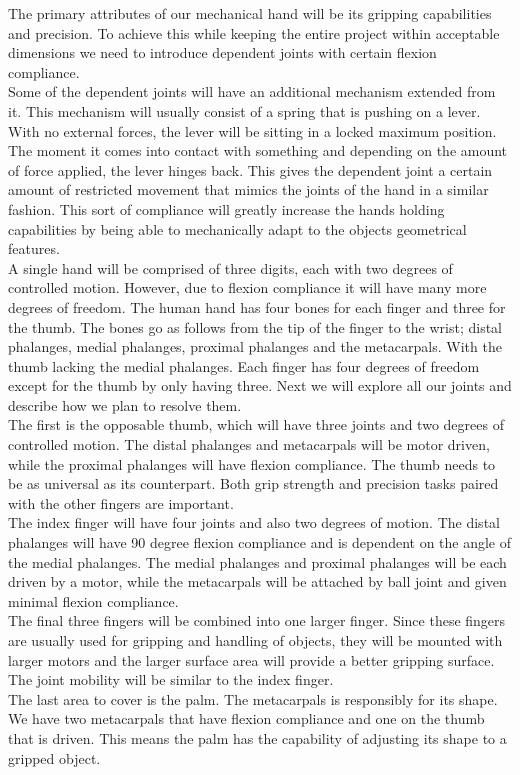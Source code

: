 \documentclass{article}
\begin{document}
The primary attributes of our mechanical hand will be its gripping capabilities and precision. To achieve this while keeping the entire project within acceptable dimensions we need to introduce dependent joints with certain flexion compliance. \\[12pt] 
\indent Some of the dependent joints will have an additional mechanism extended from it. This mechanism will usually consist of a spring that is pushing on a lever. With no external forces, the lever will be sitting in a locked maximum position. The moment it comes into contact with something and depending on the amount of force applied, the lever hinges back. This gives the dependent joint a certain amount of restricted movement that mimics the joints of the hand in a similar fashion. This sort of compliance will greatly increase the hands holding capabilities by being able to mechanically adapt to the objects geometrical features. \\[12pt]
\indent A single hand will be comprised of three digits, each with two degrees of controlled motion. However, due to flexion compliance it will have many more degrees of freedom. The human hand has four bones for each finger and three for the thumb. The bones go as follows from the tip of the finger to the wrist; distal phalanges, medial phalanges, proximal phalanges and the metacarpals. With the thumb lacking the medial phalanges. Each finger has four degrees of freedom except for the thumb by only having three. Next we will explore all our joints and describe how we plan to resolve them. \\[12pt]
\indent The first is the opposable thumb, which will have three joints and two degrees of controlled motion. The distal phalanges and metacarpals will be motor driven, while the proximal phalanges will have flexion compliance. The thumb needs to be as universal as its counterpart. Both grip strength and precision tasks paired with the other fingers are important. \\[12pt]
\indent The index finger will have four joints and also two degrees of motion. The distal phalanges will have 90 degree flexion compliance and is dependent on the angle of the medial phalanges. The medial phalanges and proximal phalanges will be each driven by a motor, while the metacarpals will be attached by ball joint and given minimal flexion compliance. \\[12pt]
\indent The final three fingers will be combined into one larger finger. Since these fingers are usually used for gripping and handling of objects, they will be mounted with larger motors and the larger surface area will provide a better gripping surface. The joint mobility will be similar to the index finger. \\[12pt]
\indent The last area to cover is the palm. The metacarpals is responsibly for its shape. We have two metacarpals that have flexion compliance and one on the thumb that is driven. This means the palm has the capability of adjusting its shape to a gripped object.
\end{document}
